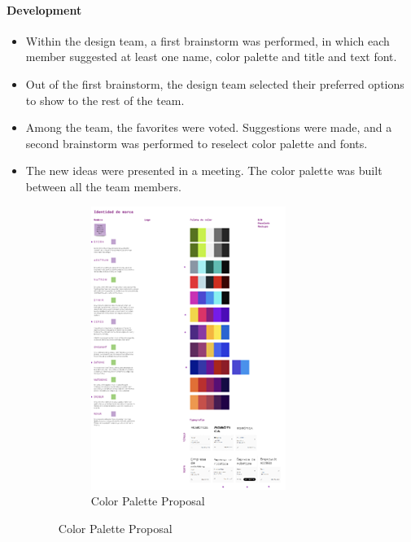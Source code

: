 \documentclass{article}
\begin{document}
\paragraph{Development}
\begin{itemize}
    \item Within the design team, a first brainstorm was performed, in which each member suggested at least one name, color palette and title and text font. 
    \item Out of the first brainstorm, the design team selected their preferred options to show to the rest of the team. 
    \item Among the team, the favorites were voted. Suggestions were made, and a second brainstorm was performed to reselect color palette and fonts. 
    \item The new ideas were presented in a meeting. The color palette was built between all the team members. 
    \begin{figure}[H]
        \centering
        \begin{subfigure}{.5\textwidth}
          \centering
          \includegraphics[width=.8\linewidth]{Images/Design/ColorsV1.png}
          \caption{Color Palette Proposal}
          

\end{subfigure}
\end{figure}
\end{itemize}
\end{document}
